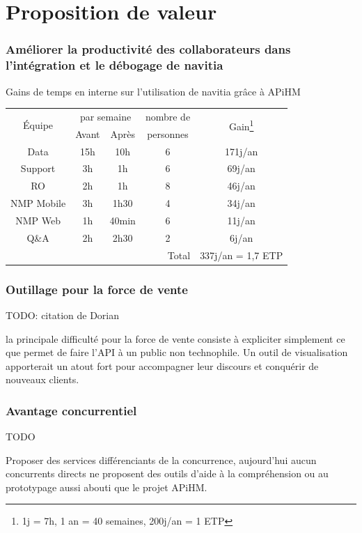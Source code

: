 \documentclass[table]{beamer}
\begin{document}
\section{Proposition de valeur}

\begin{frame}
  \frametitle{Améliorer la productivité des collaborateurs dans
    l'intégration et le débogage de navitia}

  \centering Gains de temps en interne sur l'utilisation de navitia
  grâce à APiHM
  \vfill
  \begin{tabular}{|c|c|c|c|c|}
    \hline
    \multirow{2}{*}{Équipe}& \multicolumn{2}{c|}{par
      semaine}&nombre de&\multirow{2}{*}{Gain\footnote{1j = 7h,
        1 an = 40 semaines, 200j/an = 1 ETP}}\\
    \hhline{~--~~}
    & Avant & Après & personnes &\\
    \hline
    Data       &15h &10h & 6 & 171j/an\\
    Support    & 3h & 1h & 6 &  69j/an\\
    RO         & 2h & 1h & 8 &  46j/an\\
    NMP Mobile & 3h &1h30& 4 &  34j/an\\
    NMP Web    & 1h &40min&6 &  11j/an\\
    Q\&A       & 2h &2h30& 2 &   6j/an\\
    \hline
    \multicolumn{4}{|r|}{Total} &
    337j/an = 1{,}7 ETP\\
    \hline
  \end{tabular}
\end{frame}

\begin{frame}
  \frametitle{Outillage pour la force de vente}

  TODO: citation de Dorian

  la principale difficulté pour la force de vente consiste à
  expliciter simplement ce que permet de faire l'API à un public non
  technophile. Un outil de visualisation apporterait un atout fort
  pour accompagner leur discours et conquérir de nouveaux clients.
\end{frame}

\begin{frame}
  \frametitle{Avantage concurrentiel}

  TODO

  Proposer des services différenciants de la concurrence, aujourd'hui
  aucun concurrents directs ne proposent des outils d'aide à la
  compréhension ou au prototypage aussi abouti que le projet APiHM.
\end{frame}
\end{document}
